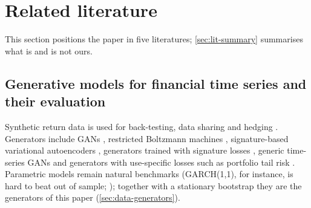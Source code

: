 \section{Related literature}\label{sec:lit}

This section positions the paper in five literatures; \cref{sec:lit-summary} summarises what is
and is not ours.

\subsection{Generative models for financial time series and their evaluation}
\label{sec:lit-synthetic}

Synthetic return data is used for back-testing, data sharing and hedging
\citep{assefa2020generating,kondratyev2019market,buehler2019deep,bailey2017probability}.
Generators include GANs \citep{wiese2020quant,takahashi2019modeling}, restricted Boltzmann
machines \citep{kondratyev2019market}, signature-based variational autoencoders
\citep{buehler2020data}, generators trained with signature losses
\citep{ni2021sig,liao2024sig,issa2023nonadversarial}, generic time-series GANs
\citep{esteban2017real,yoon2019time} and generators with use-specific losses such as portfolio
tail risk \citep{cont2026tail}. Parametric models remain natural benchmarks (GARCH(1,1), for
instance, is hard to beat out of sample; \citealp{hansen2005forecast}); together with a stationary
bootstrap they are the generators of this paper (\cref{sec:data-generators}).

